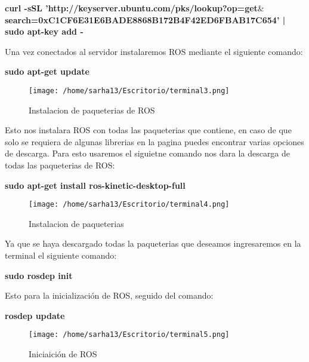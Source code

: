 \documentclass[letter,openrigth,12pt,spanish]{report}
\begin{document}
\textbf{curl -sSL 'http://keyserver.ubuntu.com/pks/lookup?op=get$\&$search=0xC1CF6E31E6BADE8868B172B4F42ED6FBAB17C654' | sudo apt-key add -}

Una vez conectados al servidor instalaremos ROS mediante el siguiente comando:\\

\begin{center}
\textbf{sudo apt-get update}\\
\end{center}

\begin{figure}[htp]
\centering
\texttt{[image: /home/sarha13/Escritorio/terminal3.png]}
\caption{Instalacion de paqueterias de ROS}
\label{Figura 6.}
\end{figure}

Esto nos instalara ROS con todas las paqueterias que contiene, en caso de que solo se requiera de algunas librerias en la pagina puedes encontrar varias opciones de descarga. Para esto usaremos el siguietne comando nos dara la descarga de todas las paqueterias de ROS:\\

\begin{center}
\textbf{sudo apt-get install ros-kinetic-desktop-full}\\
\end{center}

\begin{figure}[htp]
\centering
\texttt{[image: /home/sarha13/Escritorio/terminal4.png]}
\caption{Instalacion de paqueterias}
\label{Figura 8.}
\end{figure}

Ya que se haya descargado todas la paqueterias que deseamos ingresaremos en la terminal el siguiente comando:\\

\begin{center}
\textbf{sudo rosdep init}\\
\end{center}

Esto para la inicializaci\'on de ROS, seguido del comando:\\

\begin{center}
\textbf{rosdep update}\\
\end{center}

\begin{figure}[htp]
\centering
\texttt{[image: /home/sarha13/Escritorio/terminal5.png]}
\caption{Iniciaici\'on de ROS}
\label{Figura 9.}
\end{figure}
\end{document}
